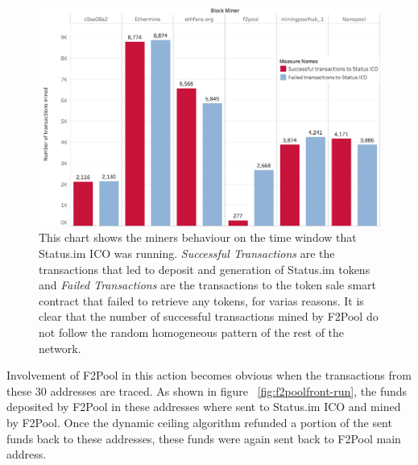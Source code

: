 \begin{figure}[h]
\centering
\includegraphics[width=0.7\linewidth]{figures/Transactions_miners_while_status_ico_cut_only_icotx.png}
\caption{This chart shows the miners behaviour on the time window that Status.im ICO was running. \textit{Successful Transactions} are the transactions that led to deposit and generation of Status.im tokens and \textit{Failed Transactions} are the transactions to the token sale smart contract that failed to retrieve any tokens, for varias reasons.  It is clear that the number of successful transactions mined by F2Pool do not follow the random homogeneous pattern of the rest of the network. \label{fig:Transactions_miners_while_status_ico_cut}} 
\end{figure}





Involvement of F2Pool in this action becomes obvious when the transactions from these 30 addresses are traced. As shown in figure ~\ref{fig:f2poolfront-run}, the funds deposited by F2Pool in these addresses where sent to Status.im ICO and mined by F2Pool. Once the dynamic ceiling algorithm refunded a portion of the sent funds back to these addresses, these funds were again sent back to F2Pool main address. 


